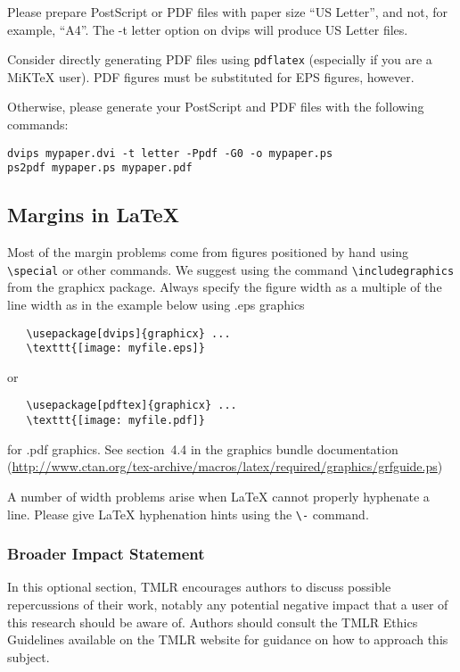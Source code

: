 \documentclass[10pt]{article} %
\begin{document}
Please prepare PostScript or PDF files with paper size ``US Letter'', and not, for example,
``A4''. The -t letter option on dvips will produce US Letter files.

Consider directly generating PDF files using \verb+pdflatex+ (especially if you are a
MiKTeX user). PDF figures must be substituted for EPS figures, however.

Otherwise, please generate your PostScript and PDF files with the following commands:
\begin{verbatim}
dvips mypaper.dvi -t letter -Ppdf -G0 -o mypaper.ps
ps2pdf mypaper.ps mypaper.pdf
\end{verbatim}

\subsection{Margins in LaTeX}

Most of the margin problems come from figures positioned by hand using \verb+\special+ or
other commands. We suggest using the command \verb+\includegraphics+ from the graphicx
package. Always specify the figure width as a multiple of the line width as in the example
below using .eps graphics
\begin{verbatim}
   \usepackage[dvips]{graphicx} ...
   \texttt{[image: myfile.eps]}
\end{verbatim}
or %
\begin{verbatim}
   \usepackage[pdftex]{graphicx} ...
   \texttt{[image: myfile.pdf]}
\end{verbatim}
for .pdf graphics. See section~4.4 in the graphics bundle documentation
(\url{http://www.ctan.org/tex-archive/macros/latex/required/graphics/grfguide.ps})

A number of width problems arise when LaTeX cannot properly hyphenate a line. Please give
LaTeX hyphenation hints using the \verb+\-+ command.

\subsubsection*{Broader Impact Statement}
In this optional section, TMLR encourages authors to discuss possible repercussions of their work,
notably any potential negative impact that a user of this research should be aware of.
Authors should consult the TMLR Ethics Guidelines available on the TMLR website
for guidance on how to approach this subject.
\end{document}
